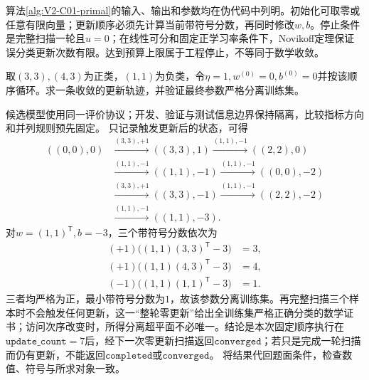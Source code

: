 算法\ref{alg:V2-C01-primal}的输入、输出和参数均在伪代码中列明。初始化可取零或任意有限向量；更新顺序必须先计算当前带符号分数，再同时修改$w,b$。停止条件是完整扫描一轮且$u=0$；在线性可分和固定正学习率条件下，Novikoff定理保证误分类更新次数有限。达到预算上限属于工程停止，不等同于数学收敛。

\begin{example}[原始形式的手工执行]\label{exm:V2-C01-primal}
取$(3,3),(4,3)$为正类，$(1,1)$为负类，令$\eta=1,w^{(0)}=0,b^{(0)}=0$并按该顺序循环。求一条收敛的更新轨迹，并验证最终参数严格分离训练集。
\end{example}
\begin{solution}
\SolGiven 候选模型使用同一评价协议；开发、验证与测试信息边界保持隔离，比较指标方向和并列规则预先固定。
\SolDerive
只记录触发更新后的状态，可得
\[
\begin{aligned}
((0,0),0)
&\xrightarrow{(3,3),+1}((3,3),1)
\xrightarrow{(1,1),-1}((2,2),0)\\
&\xrightarrow{(1,1),-1}((1,1),-1)
\xrightarrow{(1,1),-1}((0,0),-2)\\
&\xrightarrow{(3,3),+1}((3,3),-1)
\xrightarrow{(1,1),-1}((2,2),-2)\\
&\xrightarrow{(1,1),-1}((1,1),-3).
\end{aligned}
\]
对$w=(1,1)^{\mathsf T},b=-3$，三个带符号分数依次为
\[
\begin{aligned}
(+1)\bigl((1,1)(3,3)^{\mathsf T}-3\bigr)&=3,\\
(+1)\bigl((1,1)(4,3)^{\mathsf T}-3\bigr)&=4,\\
(-1)\bigl((1,1)(1,1)^{\mathsf T}-3\bigr)&=1.
\end{aligned}
\]
三者均严格为正，最小带符号分数为$1$，故该参数分离训练集。再完整扫描三个样本时不会触发任何更新，这一“整轮零更新”给出全训练集严格正确分类的数学证书；访问次序改变时，所得分离超平面不必唯一。结论是本次固定顺序执行在$\mathtt{update\_count}=7$后，经下一次零更新扫描返回$\mathtt{converged}$；若只是完成一轮扫描而仍有更新，不能返回$\mathtt{completed}$或$\mathtt{converged}$。
\SolCheck 将结果代回题面条件，检查数值、符号与所求对象一致。
\end{solution}

